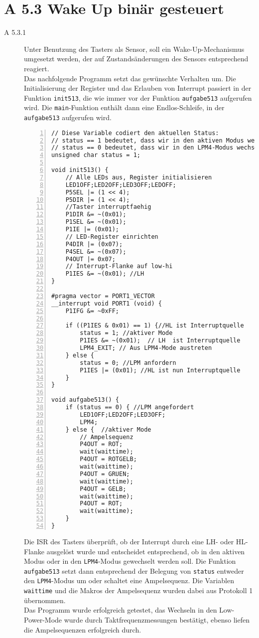 \documentclass[11pt,a4paper,ngerman]{article}
\begin{document}
\section*{A 5.3 Wake Up binär gesteuert}
\begin{description}
	\item[A 5.3.1] Unter Benutzung des Tasters als Sensor, soll ein Wake-Up-Mechanismus umgesetzt werden, der auf Zustandsänderungen des Sensors entsprechend reagiert. \\
	
	Das nachfolgende Programm setzt das gewünschte Verhalten um. Die Initialisierung der Register und das Erlauben von Interrupt passiert in der Funktion \texttt{init513}, die wie immer vor der Funktion \texttt{aufgabe513} aufgerufen wird. Die \texttt{main}-Funktion enthält dann eine Endlos-Schleife, in der \texttt{aufgabe513} aufgerufen wird.
	
	\begin{lstlisting}[numbers=left]
// Diese Variable codiert den aktuellen Status:
// status == 1 bedeutet, dass wir in den aktiven Modus wechseln
// status == 0 bedeutet, dass wir in den LPM4-Modus wechseln 
unsigned char status = 1;

void init513() {
	// Alle LEDs aus, Register initialisieren
	LED1OFF;LED2OFF;LED3OFF;LEDOFF;
	P5SEL |= (1 << 4);
	P5DIR |= (1 << 4);
	//Taster interruptfaehig
	P1DIR &= ~(0x01);
    P1SEL &= ~(0x01);
    P1IE |= (0x01);
	// LED-Register einrichten
    P4DIR |= (0x07);
    P4SEL &= ~(0x07);
    P4OUT |= 0x07;
	// Interrupt-Flanke auf low-hi
    P1IES &= ~(0x01); //LH
}

#pragma vector = PORT1_VECTOR
__interrupt void PORT1 (void) {
	P1IFG &= ~0xFF;

	if ((P1IES & 0x01) == 1) {//HL ist Interruptquelle
  		status = 1; //aktiver Mode
  		P1IES &= ~(0x01);  // LH  ist Interruptquelle
  		LPM4_EXIT; // Aus LPM4-Mode austreten
  	} else {
  		status = 0; //LPM anfordern
  		P1IES |= (0x01); //HL ist nun Interruptquelle
  	}
}

void aufgabe513() {
	if (status == 0) { //LPM angefordert
		LED1OFF;LED2OFF;LED3OFF;
		LPM4; 
	} else {  //aktiver Mode
		// Ampelsequenz
		P4OUT = ROT;
		wait(waittime);
		P4OUT = ROTGELB;
		wait(waittime);
		P4OUT = GRUEN;
		wait(waittime);
		P4OUT = GELB;
		wait(waittime);
		P4OUT = ROT;
		wait(waittime);
	}
}
	\end{lstlisting}
	
	Die ISR des Tasters überprüft, ob der Interrupt durch eine LH- oder HL-Flanke ausgelöst wurde und entscheidet entsprechend, ob in den aktiven Modus oder in den \texttt{LPM4}-Modus gewechselt werden soll. Die Funktion \texttt{aufgabe513} setzt dann entsprechend der Belegung von \texttt{status} entweder den \texttt{LPM4}-Modus um oder schaltet eine Ampelsequenz. Die Variablen \texttt{waittime} und die Makros der Ampelsequenz wurden dabei aus Protokoll 1 übernommen.\\
	Das Programm wurde erfolgreich getestet, das Wechseln in den Low-Power-Mode wurde durch Taktfrequenzmessungen bestätigt, ebenso liefen die Ampelsequenzen erfolgreich durch.
\end{description}
\label{LastPage}
\end{document}
